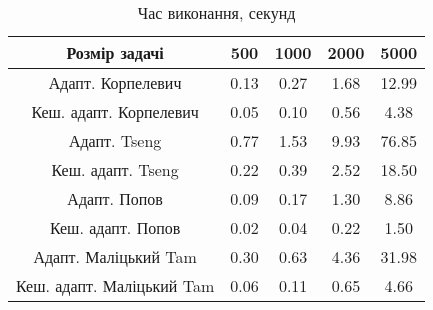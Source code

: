 \begin{table}[H]
	\centering
	\begin{tabular}{|c||c|c|c|c|}\hline
		Розмір задачі & 500 & 1000 & 2000 & 5000 \\ \hline \hline
		Адапт. Корпелевич & 0.13 & 0.27 & 1.68 & 12.99 \\ \hline
		Кеш. адапт. Корпелевич & 0.05 & 0.10 & 0.56 & 4.38 \\ \hline
		Адапт. Tseng & 0.77 & 1.53 & 9.93 & 76.85 \\ \hline
		Кеш. адапт. Tseng & 0.22 & 0.39 & 2.52 & 18.50 \\ \hline
		Адапт. Попов & 0.09 & 0.17 & 1.30 & 8.86 \\ \hline
		Кеш. адапт. Попов & 0.02 & 0.04 & 0.22 & 1.50 \\ \hline
		Адапт. Маліцький Tam & 0.30 & 0.63 & 4.36 & 31.98 \\ \hline
		Кеш. адапт. Маліцький Tam & 0.06 & 0.11 & 0.65 & 4.66 \\ \hline
	\end{tabular}
	\caption{Час виконання, секунд}
\end{table}
